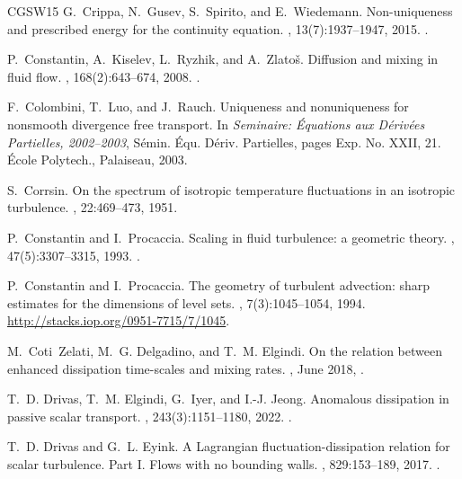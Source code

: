\documentclass[12pt]{report}   %
\numberwithin{equation}{section}
\theoremstyle{plain}
\theoremstyle{definition}
\theoremstyle{remark}
\begin{document}
\begin{thebibliography}{CGSW15}
G.~Crippa, N.~Gusev, S.~Spirito, and E.~Wiedemann.
\newblock Non-uniqueness and prescribed energy for the continuity equation.
, 13(7):1937--1947, 2015.
\newblock {}.

P.~Constantin, A.~Kiselev, L.~Ryzhik, and A.~Zlato{\v{s}}.
\newblock Diffusion and mixing in fluid flow.
, 168(2):643--674, 2008.
\newblock {}.

F.~Colombini, T.~Luo, and J.~Rauch.
\newblock Uniqueness and nonuniqueness for nonsmooth divergence free transport.
\newblock In {\em Seminaire: \'{E}quations aux {D}\'{e}riv\'{e}es {P}artielles,
  2002--2003}, S\'{e}min. \'{E}qu. D\'{e}riv. Partielles, pages Exp. No. XXII,
  21. \'{E}cole Polytech., Palaiseau, 2003.

S.~Corrsin.
\newblock On the spectrum of isotropic temperature fluctuations in an isotropic
  turbulence.
, 22:469--473, 1951.

P.~Constantin and I.~Procaccia.
\newblock Scaling in fluid turbulence: a geometric theory.
, 47(5):3307--3315, 1993.
\newblock {}.

P.~Constantin and I.~Procaccia.
\newblock The geometry of turbulent advection: sharp estimates for the
  dimensions of level sets.
, 7(3):1045--1054, 1994.
\newblock \urlprefix\url{http://stacks.iop.org/0951-7715/7/1045}.

M.~Coti~Zelati, M.~G. Delgadino, and T.~M. Elgindi.
\newblock On the relation between enhanced dissipation time-scales and mixing
  rates.
, June 2018,
  .

T.~D. Drivas, T.~M. Elgindi, G.~Iyer, and I.-J. Jeong.
\newblock Anomalous dissipation in passive scalar transport.
, 243(3):1151--1180, 2022.
\newblock {}.

T.~D. Drivas and G.~L. Eyink.
\newblock A {L}agrangian fluctuation-dissipation relation for scalar
  turbulence. {P}art {I}. {F}lows with no bounding walls.
, 829:153--189, 2017.
\newblock {}.


\end{thebibliography}
\end{document}

